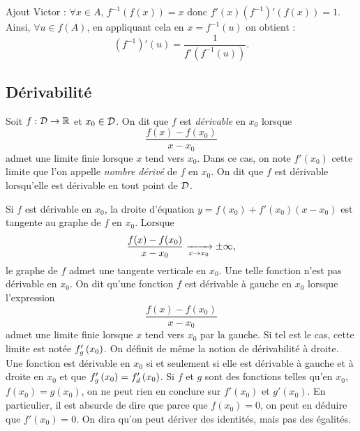 \documentclass{magnolia}
\begin{document}
\begin{sol}
Ajout Victor : $\forall x \in A$, $f^{-1}(f(x))=x$ donc $f'(x)(f^{-1})'(f(x))=1$. Ainsi, $\forall u \in f(A)$, en appliquant cela en $x=f^{-1}(u)$ on obtient :
\[(f^{-1})'(u)=\frac{1}{f'(f^{-1}(u))}.\]
\end{sol}

\subsection{Dérivabilité}

\begin{definition}[utile=-3]
Soit $f:\mathcal{D}\to\mathbb{R}$ et $x_0\in\mathcal{D}$. On dit que $f$ est \emph{dérivable} en
$x_0$ lorsque
\[\frac{f(x)-f(x_0)}{x-x_0}\]
admet une limite finie lorsque $x$ tend vers $x_0$. Dans ce cas, on note $f'(x_0)$
cette limite que l'on appelle \emph{nombre dérivé} de $f$ en $x_0$.
On dit que $f$ est dérivable lorsqu'elle est dérivable en tout point de $\mathcal{D}$.
\end{definition}

\begin{remarques}
\remarque Si $f$ est dérivable en $x_0$, la droite d'équation
  $y=f(x_0)+f'(x_0)(x-x_0)$
  est tangente au graphe de $f$ en $x_0$.
\remarque Lorsque
  \[\frac{f(x)-f(x_0)}{x-x_0}\xrightarrow[x\rightarrow x_0]{}\pm\infty,\]
  le graphe de $f$ admet une tangente verticale en $x_0$. Une telle fonction n'est pas dérivable en $x_0$.
\remarque On dit qu'une fonction $f$ est dérivable à gauche en $x_0$ lorsque
  l'expression
  \[\frac{f(x)-f(x_0)}{x-x_0}\]
  admet une limite finie lorsque $x$ tend vers $x_0$ par la gauche. Si tel est le
  cas, cette limite est notée $f_g'\left(x_0\right)$. On définit de même la notion de
  dérivabilité à droite. Une fonction est dérivable en $x_0$ si et seulement si
  elle est dérivable à gauche et à droite en $x_0$ et que
  $f_g'\left(x_0\right)=f_d'\left(x_0\right)$.
\remarque Si $f$ et $g$ sont des fonctions telles qu'en $x_0$, $f(x_0)=g(x_0)$, on ne peut rien en conclure sur
  $f'(x_0)$ et $g'(x_0)$. En particulier, il est absurde de dire que parce que
  $f(x_0)=0$, on peut en déduire que $f'(x_0)=0$.
  On dira qu'on peut dériver des identités, mais pas des égalités.
\end{remarques}
\end{document}
